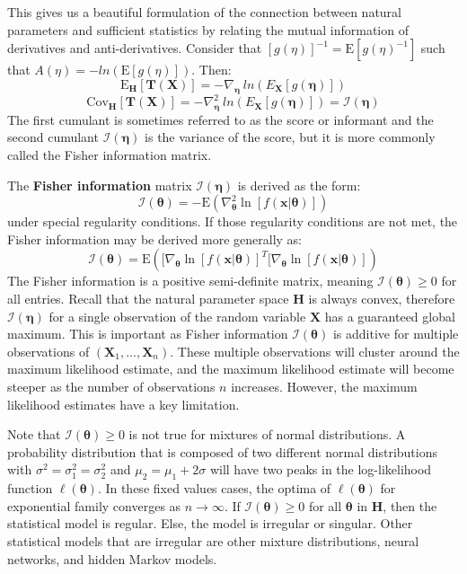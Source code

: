 \documentclass[10pt, a5paper, twoside, openright]{memoir}
\begin{document}
This gives us a beautiful formulation of the connection between natural parameters and sufficient statistics by relating the mutual information of derivatives and anti-derivatives. Consider that $[g(\eta)]^{-1} = \mathrm{E}[g(\eta)^{-1}]$ such that $A(\eta) = -ln(\mathrm{E}[g(\eta)])$. Then:
$$\mathrm{E}_{\boldsymbol H}[\boldsymbol{T(X)}] = -\nabla_{\boldsymbol \eta} \ ln(E_{\boldsymbol X}[g(\boldsymbol \eta)])$$
$$\mathrm{Cov}_{\boldsymbol H}[\boldsymbol{T(X)}] = -\nabla_{\boldsymbol \eta}^2 \ ln(E_{\boldsymbol X}[g(\boldsymbol \eta)]) = \mathcal I (\boldsymbol \eta)$$
The first cumulant is sometimes referred to as the score or informant and the second cumulant $\mathcal I (\boldsymbol \eta)$ is the variance of the score, but it is more commonly called the Fisher information matrix.

The \textbf{Fisher information} matrix $\mathcal I(\boldsymbol \eta)$ is derived as the form:
$$\mathcal I (\boldsymbol \theta) = -\mathrm{E}(\nabla^2_{\boldsymbol \theta} \ln [f(\boldsymbol x | \boldsymbol \theta)])$$
under special regularity conditions. If those regularity conditions are not met, the Fisher information may be derived more generally as:
$$\mathcal I (\boldsymbol \theta) = \mathrm{E}([\nabla_{\boldsymbol \theta} \ln [f(\boldsymbol x | \boldsymbol \theta)]^T [\nabla_{\boldsymbol \theta} \ln [f(\boldsymbol x | \boldsymbol \theta)])$$
The Fisher information is a positive semi-definite matrix, meaning $\mathcal I(\boldsymbol \theta) \geq 0$ for all entries. Recall that the natural parameter space $\boldsymbol H$ is always convex, therefore $\mathcal I(\boldsymbol \eta)$ for a single observation of the random variable $\boldsymbol X$ has a guaranteed global maximum. This is important as Fisher information $\mathcal I(\boldsymbol \theta)$ is additive for multiple observations of $(\boldsymbol X_1,...,\boldsymbol X_n)$. These multiple observations will cluster around the maximum likelihood estimate, and the maximum likelihood estimate will become steeper as the number of observations $n$ increases. However, the maximum likelihood estimates have a key limitation.

Note that $\mathcal I(\boldsymbol \theta) \geq 0$ is not true for mixtures of normal distributions. A probability distribution that is composed of two different normal distributions with $\sigma^2 = \sigma_1^2 = \sigma_2^2$ and $\mu_2 = \mu_1 + 2\sigma$ will have two peaks in the log-likelihood function $\ell (\boldsymbol \theta)$. In these fixed values cases, the optima of $\ell (\boldsymbol \theta)$ for exponential family converges as $n \rightarrow \infty$. If $\mathcal I(\boldsymbol \theta) \geq 0$ for all $\boldsymbol \theta$ in $\boldsymbol H$, then the statistical model is regular. Else, the model is irregular or singular. Other statistical models that are irregular are other mixture distributions, neural networks, and hidden Markov models.
\end{document}
